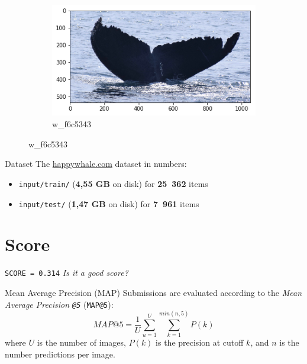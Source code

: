 \begin{frame}[c]
\begin{figure}
\begin{subfigure}[b]{0.24\linewidth}
            \centering
            \includegraphics[width=\linewidth]{Whales/w_f6c5343.png}
            \caption{w\_f6c5343}
        \end{subfigure}
    \end{figure}
\end{frame}

\begin{frame}[c]{Dataset}
    The \url{happywhale.com} dataset in numbers:
    \begin{center}
    \begin{itemize}
        \item \texttt{input/train/} (\Large{\textbf{4,55 GB}} on disk) for \textbf{25 362} items
        \large \item \texttt{input/test/} (\large{\textbf{1,47 GB}} on disk) for \textbf{7 961} items
    \end{itemize}
    \end{center}
\end{frame}

\begin{frame}
\end{frame}

\section{Score}
\begin{frame}[c]
    \Huge \texttt{SCORE = 0.314}
    \newline\newline
    \tiny \emph{Is it a good score?} %
\end{frame}

\begin{frame}[c]{Mean Average Precision (MAP)}
    Submissions are evaluated according to the \emph{Mean Average Precision
    \texttt{@5}} (\texttt{MAP@5}):
    $$MAP@5 = \frac{1}{U} \sum_{u=1}^{U}  \sum_{k=1}^{min(n,5)} P(k)$$
    where $U$ is the number of images, $P(k)$ is the precision at cutoff $k$, and
    $n$ is the number predictions per image.
\end{frame}


